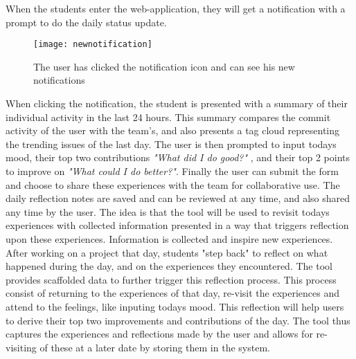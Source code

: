 When the students enter the web-application, they will get a notification with a prompt to do the daily status update.

\begin{figure}[h!]
\label{newnotification}
\centering
	\texttt{[image: newnotification]}
\caption{The user has clicked the notification icon and can see his new notifications}
\end{figure}

  When clicking the notification, the student is presented with a summary of their individual activity in the last 24 hours.
  This summary compares the commit activity of the user with the team's, and also presents a tag cloud representing the trending issues of the last day. The user is then prompted to input todays mood, their top two contributions \emph{"What did I do good?"} , and their top 2 points to improve on \emph{"What could I do better?"}. Finally the user can submit the form and choose to share these experiences with the team for collaborative use. The daily reflection notes are saved and can be reviewed at any time, and also shared any time by the user. The idea is that the tool will be used to revisit todays experiences with collected information presented in a way that triggers reflection upon these experiences. Information is collected and inspire new experiences. After working on a project that day, students "step back" to reflect on what happened during the day, and on the experiences they encountered. The tool provides scaffolded data to further trigger this reflection process. This process consist of returning to the experiences of that day, re-visit the experiences and attend to the feelings, like inputing todays mood. This reflection will help users to derive their top two improvements and contributions of the day\citep{Krogstie2011}. The tool thus captures the experiences and reflections made by the user and allows for re-visiting of these at a later date by storing them in the system. 

